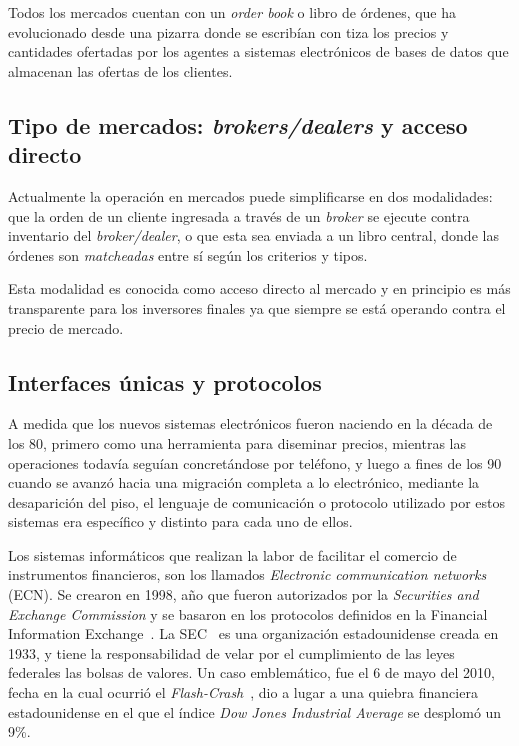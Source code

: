 Todos los mercados cuentan con un \emph{order book} o libro de órdenes, que ha
evolucionado desde una pizarra donde se escribían con tiza los precios y
cantidades ofertadas por los agentes a sistemas electrónicos de bases de datos
que almacenan las ofertas de los clientes.


\subsection{Tipo de mercados: \emph{brokers/dealers} y acceso directo}

Actualmente la operación en mercados puede simplificarse en dos modalidades:
que la orden de un cliente ingresada a través de un \emph{broker} se ejecute
contra inventario del \emph{broker/dealer}, o que esta sea enviada a un libro
central, donde las órdenes son \emph{matcheadas} entre sí según los criterios y
tipos.

Esta modalidad es conocida como acceso directo al mercado y en principio es más 
transparente para los inversores finales ya que siempre se está operando contra 
el precio de mercado.


\subsection{Interfaces únicas y protocolos}
A medida que los nuevos sistemas electrónicos fueron naciendo en la década de
los 80, primero como una herramienta para diseminar precios, mientras las
operaciones todavía seguían concretándose por teléfono, y luego a fines de los
90 cuando se avanzó hacia una migración completa a lo electrónico, mediante la
desaparición del piso, el lenguaje de comunicación o protocolo utilizado por
estos sistemas era específico y distinto para cada uno de ellos.

Los sistemas informáticos que realizan la labor de facilitar el comercio de
instrumentos financieros, son los llamados \emph{Electronic communication
networks} (ECN).  Se crearon en 1998, año que fueron autorizados por la
\emph{Securities and Exchange Commission} y se basaron en los protocolos
definidos en la Financial Information Exchange~\cite{mcandrews2000emergence}.
La SEC~\cite{hasbrouck2004economic} es una organización estadounidense creada
en 1933, y tiene la responsabilidad de velar por el cumplimiento de las leyes
federales las bolsas de valores. Un caso emblemático, fue el 6 de mayo del
2010, fecha en la cual ocurrió el \emph{Flash-Crash}~\cite{arndt2011high}, dio
a lugar a una quiebra financiera estadounidense en el que el índice \emph{Dow
Jones Industrial Average} se desplomó un 9\%. 

